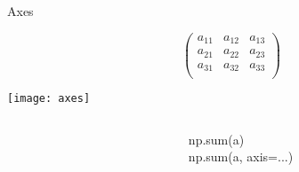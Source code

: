 \begin{frame}{Axes}
 \begin{Large}
  \begin{displaymath}
   \begin{pmatrix}
    a_{11} & a_{12} & a_{13} \\
    a_{21} & a_{22} & a_{23} \\
    a_{31} & a_{32} & a_{33} \\
   \end{pmatrix}
  \end{displaymath}
 \end{Large}

 \begin{center}
  \texttt{[image: axes]}
 \end{center}

 \begin{columns}
  \begin{column}{0.4\linewidth}
  \end{column}%
  \begin{column}{0.6\linewidth}
   np.sum(a)\\
   np.sum(a, axis=$...$)
  \end{column}
 \end{columns}
\end{frame}

